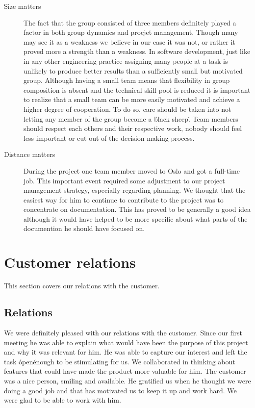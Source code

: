 \begin{description}
\item[Size matters]
The fact that the group consisted of three members definitely played a factor in both group dynamics
and procjet management. Though many may see it as a weakness we believe in our case it was not,
or rather it proved more a strength than a weakness.
In software development, just like in any other engineering practice assigning many people
at a task is unlikely to produce better results than a sufficiently small but motivated group.
Although having a small team means that flexibility in group composition is absent and
the technical skill pool is reduced it is important to realize that a small team
can be more easily motivated and achieve a higher degree of cooperation.
To do so, care should be taken into not letting any member of the group become
a \'black sheep\'. Team members should respect each others and their respective work,
nobody should feel less important or cut out of the decision making process.

\item[Distance matters]
During the project one team member moved to Oslo and got a full-time job.
This important event required some adjustment to our project management strategy,
especially regarding planning. We thought that the easiest way for him to continue
to contribute to the project was to concentrate on documentation.
This has proved to be generally a good idea although it would have helped
to be more specific about what parts of the documention he should have focused on.

\end{description}


\section{Customer relations}
This section covers our relations with the customer.

\subsection{Relations}
We were definitely pleased with our relations with the customer.
Since our first meeting he was able to explain what would have been the purpose of this project and why
it was relevant for him. He was able to capture our interest and left the task \'open\' enough to be stimulating for us.
We collaborated in thinking about features that could have made the product more valuable for him.
The customer was a nice person, smiling and available. He gratified us when he thought we were doing a good job and
that has motivated us to keep it up and work hard. We were glad to be able to work with him.

